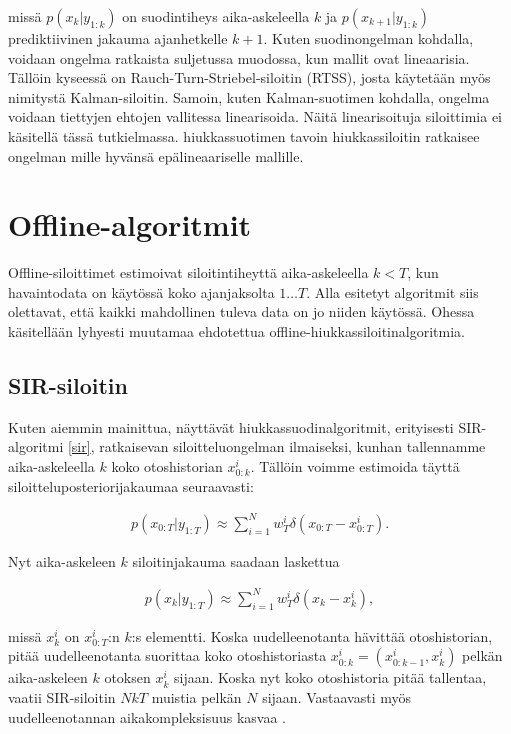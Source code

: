 \documentclass[
  12pt,
  a4paper, twoside]{book}
\begin{document}
missä \(p(x_k|y_{1:k})\) on suodintiheys aika-askeleella \(k\) ja \(p(x_{k+1}|y_{1:k})\) prediktiivinen jakauma ajanhetkelle \(k+1\). Kuten suodinongelman kohdalla, voidaan ongelma ratkaista suljetussa muodossa, kun mallit ovat lineaarisia. Tällöin kyseessä on Rauch-Turn-Striebel-siloitin (RTSS), josta käytetään myös nimitystä Kalman-siloitin. Samoin, kuten Kalman-suotimen kohdalla, ongelma voidaan tiettyjen ehtojen vallitessa linearisoida. Näitä linearisoituja siloittimia ei käsitellä tässä tutkielmassa. hiukkassuotimen tavoin hiukkassiloitin ratkaisee ongelman mille hyvänsä epälineaariselle mallille.

\section{Offline-algoritmit}

Offline-siloittimet estimoivat siloitintiheyttä aika-askeleella \(k<T\), kun havaintodata on käytössä koko ajanjaksolta \(1 \ldots T\). Alla esitetyt algoritmit siis olettavat, että kaikki mahdollinen tuleva data on jo niiden käytössä. Ohessa käsitellään lyhyesti muutamaa ehdotettua offline-hiukkassiloitinalgoritmia.

\subsection{SIR-siloitin}

Kuten aiemmin mainittua, näyttävät hiukkassuodinalgoritmit, erityisesti SIR-algoritmi \ref{sir}, ratkaisevan siloitteluongelman ilmaiseksi, kunhan tallennamme aika-askeleella \(k\) koko otoshistorian \(x_{0:k}^i\). Tällöin voimme estimoida täyttä siloitteluposteriorijakaumaa seuraavasti:

\begin{align}\label{siloitin-posteriori}
p(x_{0:T}|y_{1:T}) \approx \sum_{i=1}^N w_T^i \delta (x_{0:T}-x_{0:T}^i).
\end{align}

Nyt aika-askeleen \(k\) siloitinjakauma saadaan laskettua

\begin{align}\label{siloitin-posteriori-k}
p(x_{k}|y_{1:T}) \approx \sum_{i=1}^N w_T^i \delta (x_{k}-x_{k}^i),
\end{align}

missä \(x^i_k\) on \(x^i_{0:T}\):n \(k\):s elementti. Koska uudelleenotanta hävittää otoshistorian, pitää uudelleenotanta suorittaa koko otoshistoriasta \(x_{0:k}^i = (x_{0:k-1}^i, x_{k}^i)\) pelkän aika-askeleen \(k\) otoksen \(x_{k}^i\) sijaan. Koska nyt koko otoshistoria pitää tallentaa, vaatii SIR-siloitin \(NkT\) muistia pelkän \(N\) sijaan. Vastaavasti myös uudelleenotannan aikakompleksisuus kasvaa \citep{kitagawa-1996}.
\end{document}
